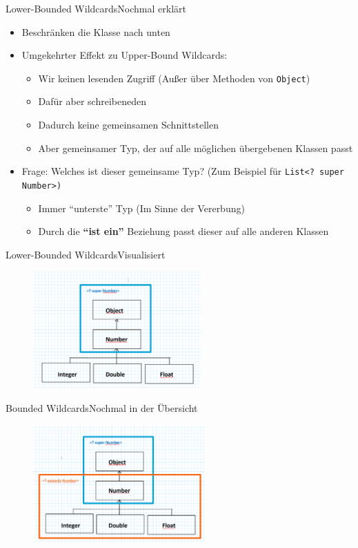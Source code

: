 \begin{frame}{Lower-Bounded Wildcards}{Nochmal erklärt}
    \begin{itemize}[<+->]
        \item Beschränken die Klasse nach unten
        \item Umgekehrter Effekt zu Upper-Bound Wildcards:
        \begin{itemize}
            \item Wir keinen lesenden Zugriff (Außer über Methoden von \texttt{Object})
            \item Dafür aber schreibeneden
            \item Dadurch keine gemeinsamen Schnittstellen
            \item Aber gemeinsamer Typ, der auf alle möglichen übergebenen Klassen passt
        \end{itemize}
        \item Frage: Welches ist dieser gemeinsame Typ? (Zum Beispiel für \texttt{List<? super Number>)}
        \begin{itemize}[<handout:0>]
            \item Immer "`unterste"' Typ (Im Sinne der Vererbung)
            \item Durch die \textbf{"`ist ein"'} Beziehung passt dieser auf alle anderen Klassen
        \end{itemize}
    \end{itemize}
\end{frame}

\begin{frame}{Lower-Bounded Wildcards}{Visualisiert}
    \begin{figure}
        \centering
        \includegraphics[height=4.5cm]{graph/lower_wildcard}
    \end{figure}
\end{frame}

\begin{frame}{Bounded Wildcards}{Nochmal in der Übersicht}
    \begin{figure}
        \centering
        \includegraphics[height=4.5cm]{graph/wildcard_bound}
    \end{figure}
\end{frame}

